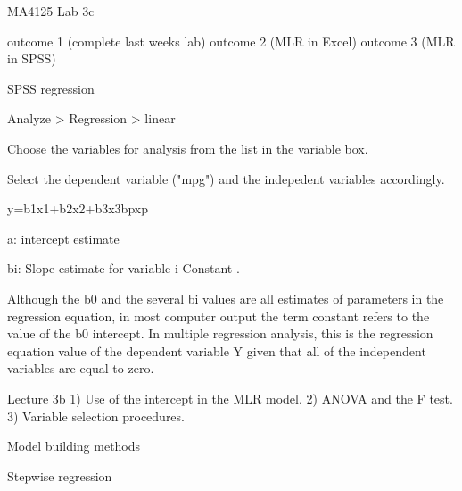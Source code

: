 


MA4125 Lab 3c

outcome 1 (complete last weeks lab)
outcome 2 (MLR in Excel)
outcome 3 (MLR in SPSS)

SPSS regression

Analyze > Regression > linear 

Choose the variables for analysis from the list in the variable box.

Select the dependent variable ("mpg") and the indepedent variables accordingly.

 
y=b1x1+b2x2+b3x3bpxp
 
a: intercept estimate
 
bi: Slope estimate for variable i
Constant . 

Although the b0 and the several bi values are all estimates of
parameters in the regression equation, in most computer output the term constant refers to the value of the b0
intercept. In multiple regression analysis, this is the regression equation value of the dependent variable Y given
that all of the independent variables are equal to zero.

Lecture 3b 
1) Use of the intercept in the MLR model.
2) ANOVA and the F test.
3)  Variable selection procedures.


Model building methods

Stepwise regression

